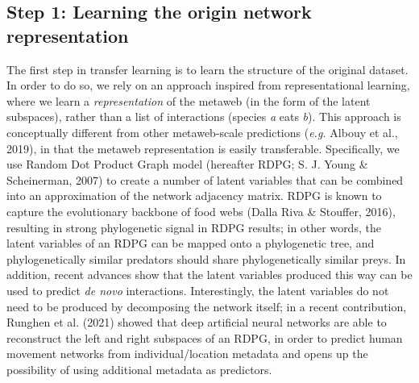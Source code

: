\documentclass[10pt,oneside]{article}
\begin{document}
\hypertarget{step-1-learning-the-origin-network-representation}{%
\subsection{Step 1: Learning the origin network
representation}\label{step-1-learning-the-origin-network-representation}}

The first step in transfer learning is to learn the structure of the
original dataset. In order to do so, we rely on an approach inspired
from representational learning, where we learn a \emph{representation}
of the metaweb (in the form of the latent subspaces), rather than a list
of interactions (species \emph{a} eats \emph{b}). This approach is
conceptually different from other metaweb-scale predictions (\emph{e.g.}
Albouy et al., 2019), in that the metaweb representation is easily
transferable. Specifically, we use Random Dot Product Graph model
(hereafter RDPG; S. J. Young \& Scheinerman, 2007) to create a number of
latent variables that can be combined into an approximation of the
network adjacency matrix. RDPG is known to capture the evolutionary
backbone of food webs (Dalla Riva \& Stouffer, 2016), resulting in
strong phylogenetic signal in RDPG results; in other words, the latent
variables of an RDPG can be mapped onto a phylogenetic tree, and
phylogenetically similar predators should share phylogenetically similar
preys. In addition, recent advances show that the latent variables
produced this way can be used to predict \emph{de novo} interactions.
Interestingly, the latent variables do not need to be produced by
decomposing the network itself; in a recent contribution, Runghen et al.
(2021) showed that deep artificial neural networks are able to
reconstruct the left and right subspaces of an RDPG, in order to predict
human movement networks from individual/location metadata and opens up
the possibility of using additional metadata as predictors.
\end{document}
